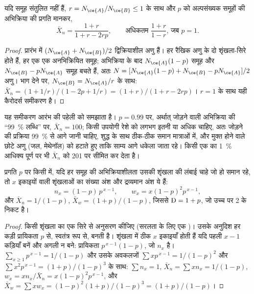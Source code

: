 \begin{corollary}[असंतुलन]\label{cor:b2:polymer-synthesis:imbalance}
यदि समूह संतुलित नहीं हैं, $r = N_{\ce{A}}/N_{\ce{B}} \le 1$ के साथ और $p$ को अल्पसंख्यक समूहों 
की अभिक्रिया की प्रगति मानकर,
\begin{equation*}
\bar X_n = \frac{1 + r}{1 + r - 2rp}, \qquad \text{अधिकतम } \frac{1+r}{1-r} \text{, जब } p = 1.
\end{equation*}
\end{corollary}

\begin{proof}
प्रारंभ में $(N_{\ce{A}} + N_{\ce{B}})/2$ द्विक्रियाशील  अणु हैं। हर रैखिक
अणु के दो शृंखला-सिरे होते हैं, हर एक एक अनभिक्रियित समूह; अभिक्रिया के बाद $N_{\ce{A}}(1-p)$
समूह  और $N_{\ce{B}} - pN_{\ce{A}}$ समूह  बचते हैं, अतः $N = [N_{\ce{A}}(1-p) + N_{\ce{B}} -
pN_{\ce{A}}]/2$ अणु। भाग देने पर, $N_{\ce{B}} = N_{\ce{A}}/r$ के साथ:
$\bar X_n = (1 + 1/r)/(1 - 2p + 1/r) = (1+r)/(1 + r - 2rp)$। $r = 1$ के साथ यही कैरोदर्स समीकरण है।
\end{proof}

यह समीकरण आरंभ की पहेली को समझाता है। $p = 0.99$ पर, अर्थात् जोड़ने वाली अभिक्रिया की ``99~\% लब्धि'' पर, $\bar X_n =
100$; किसी उपयोगी रेशे को लगभग इतनी या अधिक चाहिए, अतः जोड़ने की प्रक्रिया 99~\% से आगे जानी चाहिए, शुद्ध 
के साथ ठीक-ठीक समान मात्राओं में, और मुक्त होने वाले छोटे अणु (जल, मेथेनॉल) को हटाते हुए ताकि
साम्य आगे धकेला जाता रहे। किसी एक  का 1~\% आधिक्य पूर्ण  पर भी $\bar X_n$ को 201 पर सीमित कर देता है।

\begin{theorem}[फ़्लोरी वितरण]\label{thm:b2:polymer-synthesis:flory}
प्रगति $p$ पर किसी  में, यदि हर समूह की अभिक्रियाशीलता उसकी शृंखला की लंबाई चाहे जो हो
समान रहे, तो $x$ इकाइयों वाली शृंखलाओं का संख्या अंश और द्रव्यमान अंश ये हैं:
\begin{equation*}
n_x = (1-p)\,p^{\,x-1}, \qquad w_x = x(1-p)^2 p^{\,x-1},
\end{equation*}
और $\bar X_n = 1/(1-p)$, $\bar X_w = (1+p)/(1-p)$, जिससे $\text{\DH} = 1 + p$, जो उच्च
 पर 2 के निकट है।
\end{theorem}

\begin{proof}
किसी शृंखला का एक सिरे से अनुसरण कीजिए (सरलता के लिए एक  )। उसके अनुदिश हर कड़ी
प्रायिकता $p$ से, स्वतंत्र रूप से, बनती है। शृंखला में ठीक $x$ इकाइयाँ होती हैं यदि पहली $x-1$ कड़ियाँ बनें
और अगली न बने: प्रायिकता $p^{\,x-1}(1-p)$, जो $n_x$ है। $\sum_{x\ge1} p^{\,x-1} =
1/(1-p)$ और उसके अवकलजों $\sum x p^{\,x-1} = 1/(1-p)^2$ और $\sum x^2 p^{\,x-1} = (1+p)/(1-p)^3$ के साथ:
$\sum n_x = 1$, $\bar X_n = \sum x n_x = 1/(1-p)$, $w_x = x n_x/\bar X_n = x(1-p)^2p^{\,x-1}$, और
$\bar X_w = \sum x w_x = (1-p)^2(1+p)/(1-p)^3 = (1+p)/(1-p)$।
\end{proof}

